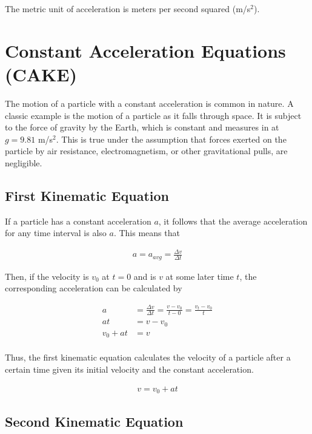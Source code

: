 \documentclass[11pt]{article}
\begin{document}
The metric unit of acceleration is meters per second squared (m/s$^{2}$).


\section{Constant Acceleration Equations (CAKE)}

The motion of a particle with a constant acceleration is common in nature. A classic example is the motion of a particle as it falls through space. It is subject to the force of gravity by the Earth, which is constant and measures in at $g = 9.81$  m/s$^{2}$. This is true under the assumption that forces exerted on the particle by air resistance, electromagnetism, or other gravitational pulls, are negligible. 

\subsection{First Kinematic Equation}

If a particle has a constant acceleration $a$, it follows that the average acceleration for any time interval is also $a$. This means that

\begin{align*}
    a = a_{avg} = \frac{\Delta v}{\Delta t}
\end{align*}

Then, if the velocity is $v_{0}$ at $t = 0$ and is $v$ at some later time $t$, the corresponding acceleration can be calculated by

\begin{align*}
    a &= \frac{\Delta v}{\Delta t} = \frac{v - v_{0}}{t - 0} = \frac{v_{t} - v_{0}}{t} \\
    at &= v - v_{0} \\
    v_{0} + at &= v \\
\end{align*}

Thus, the first kinematic equation calculates the velocity of a particle after a certain time given its initial velocity and the constant acceleration.

\begin{align*}
    v = v_{0} + at
\end{align*}

\subsection{Second Kinematic Equation}
\end{document}
